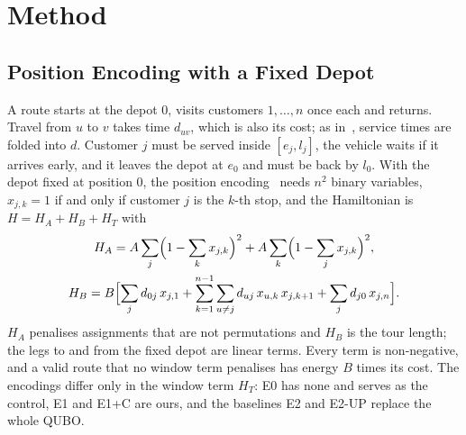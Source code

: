 \section{Method}\label{sec:method}

\subsection{Position Encoding with a Fixed Depot}\label{sec:encoding}
A route starts at the depot $0$, visits customers $1,\dots,n$ once each and returns. Travel
from $u$ to $v$ takes time $d_{uv}$, which is also its cost; as in~\cite{salehi2022unconstrained},
service times are folded into $d$. Customer $j$ must be served inside $[e_j,l_j]$, the vehicle
waits if it arrives early, and it leaves the depot at $e_0$ and must be back by $l_0$. With the
depot fixed at position $0$, the position encoding~\cite{lucas2014ising} needs $n^2$ binary
variables, $x_{j,k}=1$ if and only if customer $j$ is the $k$-th stop, and the Hamiltonian is
$H = H_A + H_B + H_T$ with
\begin{gather}
  H_A = A\sum_{j}\Bigl(1-\sum_{k}x_{j,k}\Bigr)^2 + A\sum_{k}\Bigl(1-\sum_{j}x_{j,k}\Bigr)^2, \label{eq:HA}\\
  H_B = B\Bigl[\sum_{j} d_{0j}\,x_{j,1} + \sum_{k=1}^{n-1}\sum_{u\neq j} d_{uj}\,x_{u,k}\,x_{j,k+1}
        + \sum_{j} d_{j0}\,x_{j,n}\Bigr]. \label{eq:HB}
\end{gather}
$H_A$ penalises assignments that are not permutations and $H_B$ is the tour length; the legs to
and from the fixed depot are linear terms. Every term is non-negative, and a valid route that no
window term penalises has energy $B$ times its cost. The encodings differ only in the window
term $H_T$: E0 has none and serves as the control, E1 and E1+C are ours, and the baselines E2 and
E2-UP replace the whole QUBO.


